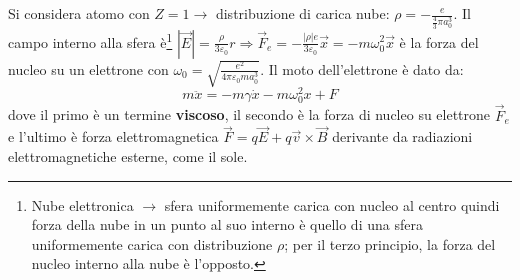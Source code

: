 \documentclass[a4paper]{scrartcl}
\numberwithin{equation}{subsection}
\theoremstyle{style1}
\begin{document}
Si considera atomo con $Z=1 \to$ distribuzione di carica nube: $\rho  = -\frac{e}{\frac{4}{3}\pi a_0^3}$. Il campo interno alla sfera \`e\footnote{Nube elettronica $\to$ sfera uniformemente carica con nucleo al centro quindi forza della nube in un punto al suo interno \`e quello di una sfera uniformemente carica con distribuzione $\rho $; per il terzo principio, la forza del nucleo interno alla nube \`e l'opposto.} $|\vec{E}| = \frac{\rho }{3\varepsilon _0}r\Rightarrow \vec{F}_e = -\frac{|\rho|  e}{3 \varepsilon _0}\vec{x}=-m\omega^2_0 \vec{x}$ \`e la forza del nucleo su un elettrone con $\omega_ 0 = \sqrt{\frac{e^2}{4\pi \varepsilon _0 m a_0^3}}$. Il moto dell'elettrone \`e dato da:
\begin{equation}
	m\ddot{x} = - m\gamma\dot{x} - m\omega_0^2 x + F
\end{equation}
dove il primo \`e un termine \textbf{viscoso}, il secondo \`e la forza di nucleo su elettrone $\vec{F}_e$ e l'ultimo \`e forza elettromagnetica $\vec{F}= q\vec{E}+q\vec{v}\times \vec{B}$ derivante da radiazioni elettromagnetiche esterne, come il sole.
\end{document}
